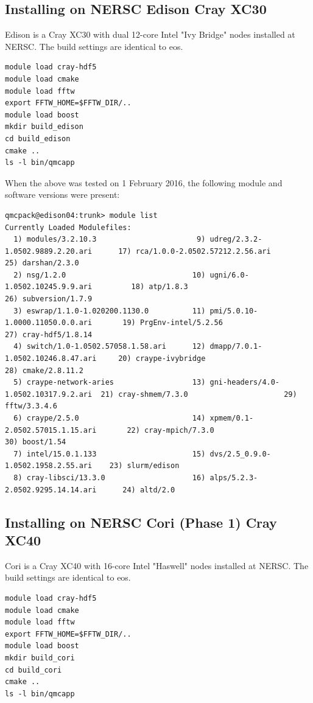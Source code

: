 \subsection{Installing on NERSC Edison Cray XC30}

Edison is a Cray XC30 with dual 12-core Intel "Ivy Bridge" nodes 
installed at NERSC. The build settings are identical to eos. 

\begin{verbatim}
module load cray-hdf5
module load cmake
module load fftw
export FFTW_HOME=$FFTW_DIR/..
module load boost
mkdir build_edison
cd build_edison
cmake ..
ls -l bin/qmcapp 
\end{verbatim}
When the above was tested on 1 February 2016, the following module and
software versions were present:
\begin{verbatim}
qmcpack@edison04:trunk> module list
Currently Loaded Modulefiles:
  1) modules/3.2.10.3                       9) udreg/2.3.2-1.0502.9889.2.20.ari      17) rca/1.0.0-2.0502.57212.2.56.ari       25) darshan/2.3.0
  2) nsg/1.2.0                             10) ugni/6.0-1.0502.10245.9.9.ari         18) atp/1.8.3                             26) subversion/1.7.9
  3) eswrap/1.1.0-1.020200.1130.0          11) pmi/5.0.10-1.0000.11050.0.0.ari       19) PrgEnv-intel/5.2.56                   27) cray-hdf5/1.8.14
  4) switch/1.0-1.0502.57058.1.58.ari      12) dmapp/7.0.1-1.0502.10246.8.47.ari     20) craype-ivybridge                      28) cmake/2.8.11.2
  5) craype-network-aries                  13) gni-headers/4.0-1.0502.10317.9.2.ari  21) cray-shmem/7.3.0                      29) fftw/3.3.4.6
  6) craype/2.5.0                          14) xpmem/0.1-2.0502.57015.1.15.ari       22) cray-mpich/7.3.0                      30) boost/1.54
  7) intel/15.0.1.133                      15) dvs/2.5_0.9.0-1.0502.1958.2.55.ari    23) slurm/edison
  8) cray-libsci/13.3.0                    16) alps/5.2.3-2.0502.9295.14.14.ari      24) altd/2.0
\end{verbatim}

\subsection{Installing on NERSC Cori (Phase 1) Cray XC40}
Cori is a Cray XC40 with 16-core Intel "Haswell" nodes 
installed at NERSC. The build settings are identical to eos. 

\begin{verbatim}
module load cray-hdf5
module load cmake
module load fftw
export FFTW_HOME=$FFTW_DIR/..
module load boost
mkdir build_cori
cd build_cori
cmake ..
ls -l bin/qmcapp 
\end{verbatim}

